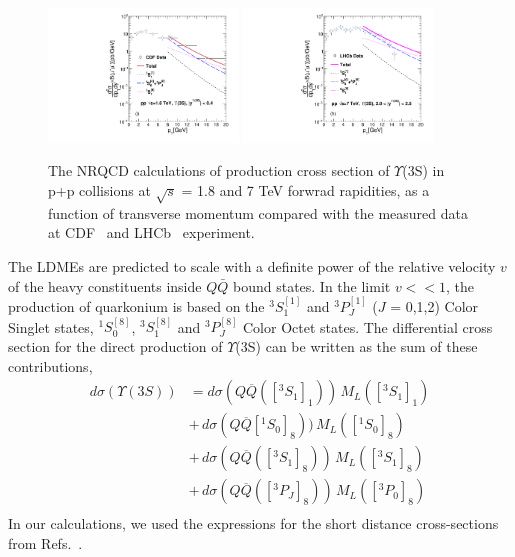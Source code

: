 \documentclass[twocolumn,amsmath,amssymb]{snp}
\begin{document}
\begin{figure}
  \includegraphics[width=0.45\textwidth]{Y3S_CDF_180GeV_Rap2025.pdf}
  \includegraphics[width=0.45\textwidth]{Y3S_LHCb_7TeV_Rap2025.pdf} 
 \caption{The NRQCD calculations of production cross section of $\Upsilon$(3S) in p+p collisions at 
   $\sqrt{s}$ = 1.8 and 7 TeV forwrad rapidities, as a function of transverse momentum compared with the measured data 
   at CDF~\cite{CDF_Acosta} and LHCb~\cite{LHCb_Aaij} experiment. }
  \label{Fig:SigmaY3SCDF}
\end{figure}
The LDMEs are predicted to scale with a definite power of the relative velocity $v$ of the heavy constituents 
inside $Q\bar Q$ bound states. In the limit $v<<1$, the production of quarkonium is based on the $^3S_1^{[1]}$ 
and $^3P_J^{[1]}$ ($J$ = 0,1,2) Color Singlet states, $^1S_0^{[8]}$, $^3S_1^{[8]}$ and $^3P_J^{[8]}$ Color 
Octet states.  The differential cross section for the direct production of $\Upsilon$(3S) can be written as the 
sum of these contributions,
\begin{eqnarray}
d\sigma(\Upsilon(3S)) &= d\sigma(Q\overline{Q}([^3S_1]_{1}))
                   \,M_{L}([^3S_1]_{1}) \nonumber \\
                &+\, d\sigma(Q\overline{Q}[^1S_0]_{8}))
                   \,M_{L}([^1S_0]_{8}) \nonumber \\ 
                &+ \, d\sigma(Q\overline{Q}([^3S_1]_{8}))
                   \,M_{L}([^3S_1]_{8}) \nonumber \\
                &+ \, d\sigma(Q\overline{Q}([^3P_J]_{8}))
                   \,M_{L}([^3P_0]_{8})\nonumber \\ \nonumber
\label{eq:dsigmaJ}
\end{eqnarray}
In our calculations, we used the expressions for the short distance cross-sections 
from Refs.~\cite{Baier:1983va,Cho:1995vh}.
\end{document}
